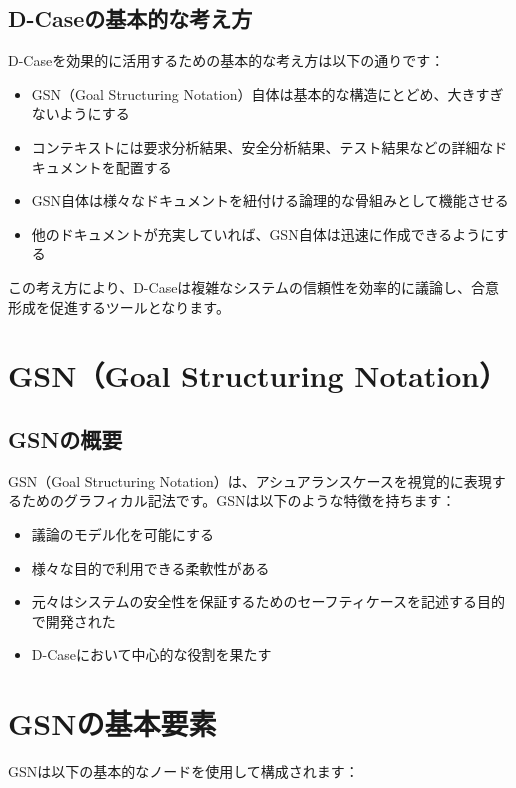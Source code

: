 \subsection{D-Caseの基本的な考え方}

D-Caseを効果的に活用するための基本的な考え方は以下の通りです：

\begin{itemize}
    \item GSN（Goal Structuring Notation）自体は基本的な構造にとどめ、大きすぎないようにする
    \item コンテキストには要求分析結果、安全分析結果、テスト結果などの詳細なドキュメントを配置する
    \item GSN自体は様々なドキュメントを紐付ける論理的な骨組みとして機能させる
    \item 他のドキュメントが充実していれば、GSN自体は迅速に作成できるようにする
\end{itemize}

この考え方により、D-Caseは複雑なシステムの信頼性を効率的に議論し、合意形成を促進するツールとなります。

\section{GSN（Goal Structuring Notation）}

\subsection{GSNの概要}

GSN（Goal Structuring Notation）は、アシュアランスケースを視覚的に表現するためのグラフィカル記法です。GSNは以下のような特徴を持ちます：

\begin{itemize}
    \item 議論のモデル化を可能にする
    \item 様々な目的で利用できる柔軟性がある
    \item 元々はシステムの安全性を保証するためのセーフティケースを記述する目的で開発された
    \item D-Caseにおいて中心的な役割を果たす
\end{itemize}

\section{GSNの基本要素}

GSNは以下の基本的なノードを使用して構成されます：

